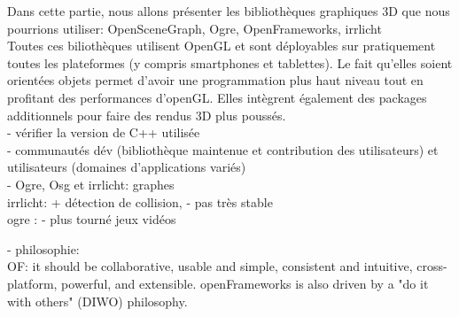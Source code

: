 Dans cette partie, nous allons présenter les bibliothèques graphiques 3D que nous pourrions utiliser: OpenSceneGraph, Ogre, OpenFrameworks, irrlicht \\
Toutes ces biliothèques utilisent OpenGL et sont déployables sur pratiquement toutes les plateformes (y compris smartphones et tablettes). Le fait qu'elles soient orientées objets permet d'avoir une programmation plus haut niveau tout en profitant des performances d'openGL. Elles intègrent également des packages additionnels pour faire des rendus 3D plus poussés. \\

- vérifier la version de C++ utilisée \\
- communautés dév (bibliothèque maintenue et contribution des utilisateurs) et utilisateurs (domaines d'applications variés) \\

- Ogre, Osg et irrlicht: graphes \\


irrlicht: + détection de collision, - pas très stable \\
ogre : - plus tourné jeux vidéos 

- philosophie: \\
OF:  it should be collaborative, usable and simple, consistent and intuitive, cross-platform, powerful, and extensible. openFrameworks is also driven by a "do it with others" (DIWO) philosophy. \\


